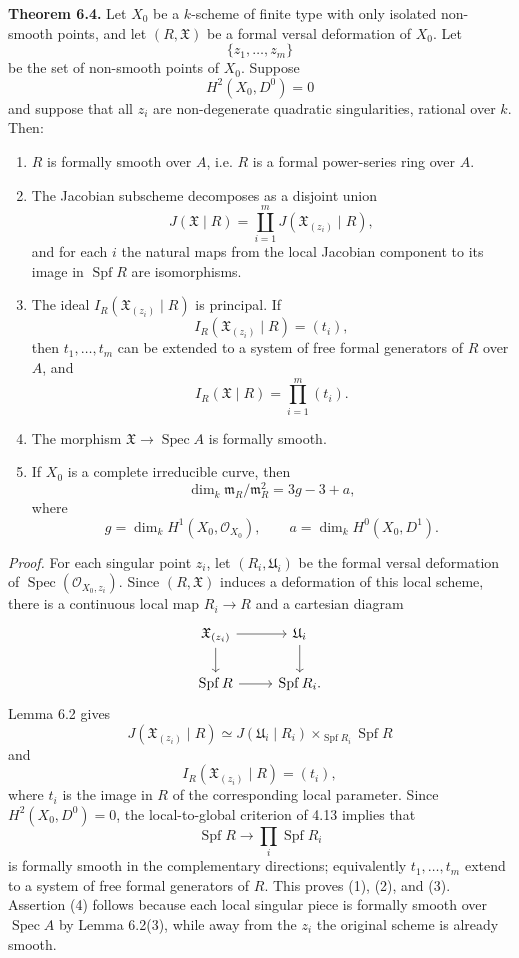 \documentclass[11pt]{article}
\providecommand{\Spec}{\operatorname{Spec}}
\providecommand{\Spf}{\operatorname{Spf}}
\providecommand{\Oo}{\mathcal O}
\begin{document}
\textbf{Theorem 6.4.}  Let \(X_0\) be a \(k\)-scheme of finite type with only isolated non-smooth points, and let \((R,\mathfrak X)\) be a formal versal deformation of \(X_0\).  Let
\[
        \{z_1,\ldots,z_m\}
\]
be the set of non-smooth points of \(X_0\).  Suppose
\[
        H^2(X_0,D^0)=0
\]
and suppose that all \(z_i\) are non-degenerate quadratic singularities, rational over \(k\).  Then:
\begin{enumerate}[label=(\arabic*)]
\item \(R\) is formally smooth over \(A\), i.e. \(R\) is a formal power-series ring over \(A\).
\item The Jacobian subscheme decomposes as a disjoint union
\[
        J(\mathfrak X\mid R)
        =
        \coprod_{i=1}^m J(\mathfrak X_{(z_i)}\mid R),
\]
and for each \(i\) the natural maps from the local Jacobian component to its image in \(\Spf R\) are isomorphisms.
\item The ideal \(I_R(\mathfrak X_{(z_i)}\mid R)\) is principal.  If
\[
        I_R(\mathfrak X_{(z_i)}\mid R)=(t_i),
\]
then \(t_1,\ldots,t_m\) can be extended to a system of free formal generators of \(R\) over \(A\), and
\[
        I_R(\mathfrak X\mid R)=\prod_{i=1}^m(t_i).
\]
\item The morphism \(\mathfrak X\to\Spec A\) is formally smooth.
\item If \(X_0\) is a complete irreducible curve, then
\[
        \dim_k\mathfrak m_R/\mathfrak m_R^2
        =
        3g-3+a,
\]
where
\[
        g=\dim_k H^1(X_0,\Oo_{X_0}),
        \qquad
        a=\dim_k H^0(X_0,D^1).
\]
\end{enumerate}

\emph{Proof.}  For each singular point \(z_i\), let \((R_i,\mathfrak U_i)\) be the formal versal deformation of \(\Spec(\Oo_{X_0,z_i})\).  Since \((R,\mathfrak X)\) induces a deformation of this local scheme, there is a continuous local map \(R_i\to R\) and a cartesian diagram
\[
\begin{tikzcd}
\mathfrak X_{(z_i)} \arrow[r] \arrow[d] &
\mathfrak U_i \arrow[d]\\
\Spf R \arrow[r] & \Spf R_i .
\end{tikzcd}
\]
Lemma 6.2 gives
\[
        J(\mathfrak X_{(z_i)}\mid R)
        \simeq
        J(\mathfrak U_i\mid R_i)\times_{\Spf R_i}\Spf R
\]
and
\[
        I_R(\mathfrak X_{(z_i)}\mid R)=(t_i),
\]
where \(t_i\) is the image in \(R\) of the corresponding local parameter.  Since \(H^2(X_0,D^0)=0\), the local-to-global criterion of 4.13 implies that
\[
        \Spf R\longrightarrow \prod_i\Spf R_i
\]
is formally smooth in the complementary directions; equivalently \(t_1,\ldots,t_m\) extend to a system of free formal generators of \(R\).  This proves (1), (2), and (3).  Assertion (4) follows because each local singular piece is formally smooth over \(\Spec A\) by Lemma 6.2(3), while away from the \(z_i\) the original scheme is already smooth.
\end{document}
